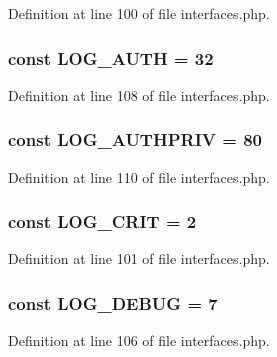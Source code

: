 Definition at line 100 of file interfaces.php.

\hypertarget{interfaceIXLLogger_a97ca345ed0839cfb6eb341e9f9a0e72f}{
\subsubsection[{LOG\_\-AUTH}]{\setlength{\rightskip}{0pt plus 5cm}const {\bf LOG\_\-AUTH} = 32}}
\label{interfaceIXLLogger_a97ca345ed0839cfb6eb341e9f9a0e72f}


Definition at line 108 of file interfaces.php.

\hypertarget{interfaceIXLLogger_a92b47d92abc4c45804664e94666fd918}{
\subsubsection[{LOG\_\-AUTHPRIV}]{\setlength{\rightskip}{0pt plus 5cm}const {\bf LOG\_\-AUTHPRIV} = 80}}
\label{interfaceIXLLogger_a92b47d92abc4c45804664e94666fd918}


Definition at line 110 of file interfaces.php.

\hypertarget{interfaceIXLLogger_a1165ceb2bedc1e9dd20e9733157a7643}{
\subsubsection[{LOG\_\-CRIT}]{\setlength{\rightskip}{0pt plus 5cm}const {\bf LOG\_\-CRIT} = 2}}
\label{interfaceIXLLogger_a1165ceb2bedc1e9dd20e9733157a7643}


Definition at line 101 of file interfaces.php.

\hypertarget{interfaceIXLLogger_a9f869ea06c29e0e5114b7e8ccfe4e30a}{
\subsubsection[{LOG\_\-DEBUG}]{\setlength{\rightskip}{0pt plus 5cm}const {\bf LOG\_\-DEBUG} = 7}}
\label{interfaceIXLLogger_a9f869ea06c29e0e5114b7e8ccfe4e30a}


Definition at line 106 of file interfaces.php.

